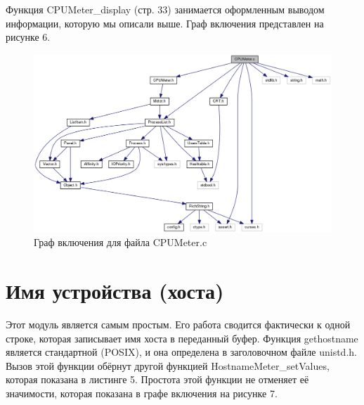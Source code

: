 \documentclass[a4paper, 12pt]{article}		%
\begin{document}
Функция CPUMeter\_display (стр. 33) занимается оформленным выводом информации, которую мы описали выше. Граф включения представлен на рисунке 6.



\begin{figure}[h!]
\centering
\includegraphics[scale=0.45]{res/cpu_meter.png}
\caption{Граф включения для файла CPUMeter.c}
\end{figure}

\newpage
\section{Имя устройства (хоста)}

Этот модуль является самым простым. Его работа сводится фактически к одной строке, которая записывает имя хоста в переданный буфер. Функция gethostname является стандартной (POSIX), и она определена в заголовочном файле unistd.h. Вызов этой функции обёрнут другой функцией HostnameMeter\_setValues, которая показана в листинге 5. Простота этой функции не отменяет её значимости, которая показана в графе включения на рисунке 7.


\end{document}
